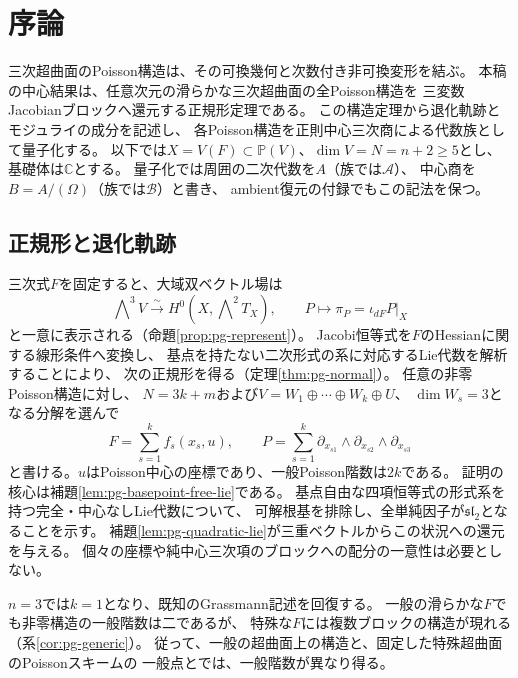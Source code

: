 \tableofcontents

\section{序論}\label{sec:paperA-introduction}

三次超曲面のPoisson構造は、その可換幾何と次数付き非可換変形を結ぶ。
本稿の中心結果は、任意次元の滑らかな三次超曲面の全Poisson構造を
三変数Jacobianブロックへ還元する正規形定理である。
この構造定理から退化軌跡とモジュライの成分を記述し、
各Poisson構造を正則中心三次商による代数族として量子化する。
以下では$X=V(F)\subset\mathbb P(V)$、$\dim V=N=n+2\ge5$とし、
基礎体は$\mathbb C$とする。
量子化では周囲の二次代数を$A$（族では$\mathcal A$）、
中心商を$B=A/(\Omega)$（族では$\mathcal B$）と書き、
ambient復元の付録でもこの記法を保つ。

\subsection*{正規形と退化軌跡}
三次式$F$を固定すると、大域双ベクトル場は
\begin{equation}\label{eq:intro-bivector-representation}
 \bigwedge\nolimits^3V\xrightarrow{\sim}H^0(X,\bigwedge\nolimits^2T_X),
 \qquad P\longmapsto\pi_P=\iota_{dF}P|_X
\end{equation}
と一意に表示される（命題\ref{prop:pg-represent}）。
Jacobi恒等式を$F$のHessianに関する線形条件へ変換し、
基点を持たない二次形式の系に対応するLie代数を解析することにより、
次の正規形を得る（定理\ref{thm:pg-normal}）。
任意の非零Poisson構造に対し、
$N=3k+m$および$V=W_1\oplus\cdots\oplus W_k\oplus U$、
$\dim W_s=3$となる分解を選んで
\begin{equation}\label{eq:intro-block-normal-form}
 F=\sum_{s=1}^k f_s(x_s,u),\qquad
 P=\sum_{s=1}^k
 \partial_{x_{s1}}\wedge\partial_{x_{s2}}\wedge\partial_{x_{s3}}
\end{equation}
と書ける。$u$はPoisson中心の座標であり、一般Poisson階数は$2k$である。
証明の核心は補題\ref{lem:pg-basepoint-free-lie}である。
基点自由な四項恒等式の形式系を持つ完全・中心なしLie代数について、
可解根基を排除し、全単純因子が$\mathfrak{sl}_2$となることを示す。
補題\ref{lem:pg-quadratic-lie}が三重ベクトルからこの状況への還元を与える。
個々の座標や純中心三次項のブロックへの配分の一意性は必要としない。

$n=3$では$k=1$となり、既知のGrassmann記述を回復する。
一般の滑らかな$F$でも非零構造の一般階数は二であるが、
特殊な$F$には複数ブロックの構造が現れる（系\ref{cor:pg-generic}）。
従って、一般の超曲面上の構造と、固定した特殊超曲面のPoissonスキームの
一般点とでは、一般階数が異なり得る。

